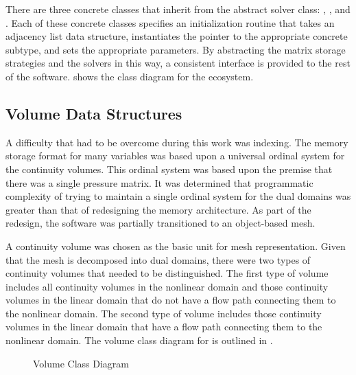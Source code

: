 There are three concrete classes that inherit from the abstract solver class: , , and .
Each of these concrete classes specifies an initialization routine that takes an adjacency list data structure, instantiates the  pointer to the appropriate concrete subtype, and sets the appropriate parameters.
By abstracting the matrix storage strategies and the solvers in this way, a consistent interface is provided to the rest of the software.
 shows the class diagram for the  ecosystem.

\subsection{Volume Data Structures}
\label{subsect:domDecompVolumeStructs}

A difficulty that had to be overcome during this work was indexing.
The memory storage format for many variables was based upon a universal ordinal system for the continuity volumes.
This ordinal system was based upon the premise that there was a single pressure matrix.
It was determined that programmatic complexity of trying to maintain a single ordinal system for the dual domains was greater than that of redesigning the memory architecture.
As part of the redesign, the software was partially transitioned to an object-based mesh.

A continuity volume was chosen as the basic unit for mesh representation.
Given that the mesh is decomposed into dual domains, there were two types of continuity volumes that needed to be distinguished.
The first type of volume includes all continuity volumes in the nonlinear domain and those continuity volumes in the linear domain that do not have a flow path connecting them to the nonlinear domain.
The second type of volume includes those continuity volumes in the linear domain that have a flow path connecting them to the nonlinear domain.
The volume class diagram for \cobra{} is outlined in .

\begin{figure}[ht!]
\singlespace\centering

\caption{Volume Class Diagram}
\label{fig:volumeClassDiagram}
\end{figure}

